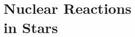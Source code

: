 \chapter[Nuclear Reactions in Stars]{\textbf{Nuclear Reactions \\ in Stars}}
\label{chap:reactions}

